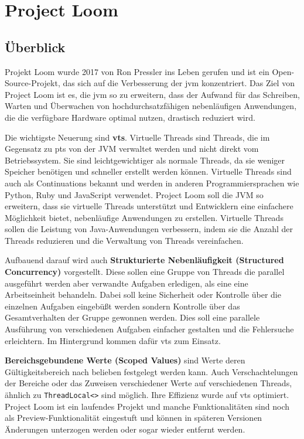 \chapter{Project Loom}
\label{cha:ProjectLoom}

\section{Überblick}                                         %
\label{sec:Überblick}

    Projekt Loom wurde 2017 von Ron Pressler ins Leben gerufen und ist ein Open-Source-Projekt, 
    das sich auf die Verbesserung der \gls{jvm} konzentriert. Das Ziel von Project Loom ist es, 
    die \gls{jvm} so zu erweitern, dass der Aufwand für das Schreiben, Warten und Überwachen von hochdurchsatzfähigen nebenläufigen Anwendungen,
    die die verfügbare Hardware optimal nutzen, drastisch reduziert wird.
    \cite{ProjectLoom}

    Die wichtigste Neuerung sind \textbf{\Glspl{vt}}.
    Virtuelle Threads sind Threads, die im Gegensatz zu \Glspl{pt} von der JVM verwaltet werden und nicht direkt vom Betriebssystem. 
    Sie sind leichtgewichtiger als normale Threads, da sie weniger Speicher benötigen und schneller erstellt werden können. \cite{JEP444}
    Virtuelle Threads sind auch als Continuations bekannt und werden in anderen Programmiersprachen wie Python, Ruby und JavaScript verwendet.
    Project Loom soll die JVM so erweitern, dass sie virtuelle Threads unterstützt und Entwicklern eine einfachere Möglichkeit bietet,
    nebenläufige Anwendungen zu erstellen. Virtuelle Threads sollen die Leistung von Java-Anwendungen verbessern, indem sie die Anzahl der Threads reduzieren und 
    die Verwaltung von Threads vereinfachen. 

    Aufbauend darauf wird auch \textbf{Strukturierte Nebenläufigkeit (Structured Concurrency)} vorgestellt.
    Diese sollen eine Gruppe von Threads die parallel ausgeführt werden aber verwandte Aufgaben erledigen, als eine eine Arbeitseinheit behandeln. 
    Dabei soll keine Sicherheit oder Kontrolle über die einzelnen Aufgaben eingebüßt werden sondern Kontrolle über das Gesamtverhalten der Gruppe gewonnen werden.
    Dies soll eine parallele Ausführung von verschiedenen Aufgaben einfacher gestalten und die Fehlersuche erleichtern.
    Im Hintergrund kommen dafür \Glspl{vt} zum Einsatz. \cite{JEP453}

    \textbf{Bereichsgebundene Werte (Scoped Values)} sind Werte deren Gültigkeitsbereich nach belieben festgelegt werden kann.
    Auch Verschachtelungen der Bereiche oder das
    Zuweisen verschiedener Werte auf verschiedenen Threads, ähnlich zu \texttt{ThreadLocal<>} sind möglich. Ihre Effizienz wurde auf \Glspl{vt} optimiert.
    \cite{JEP481}
    Project Loom ist ein laufendes Projekt und manche Funktionalitäten sind noch als Preview-Funktionalität eingestuft und können in späteren Versionen Änderungen 
    unterzogen werden oder sogar wieder entfernt werden.

